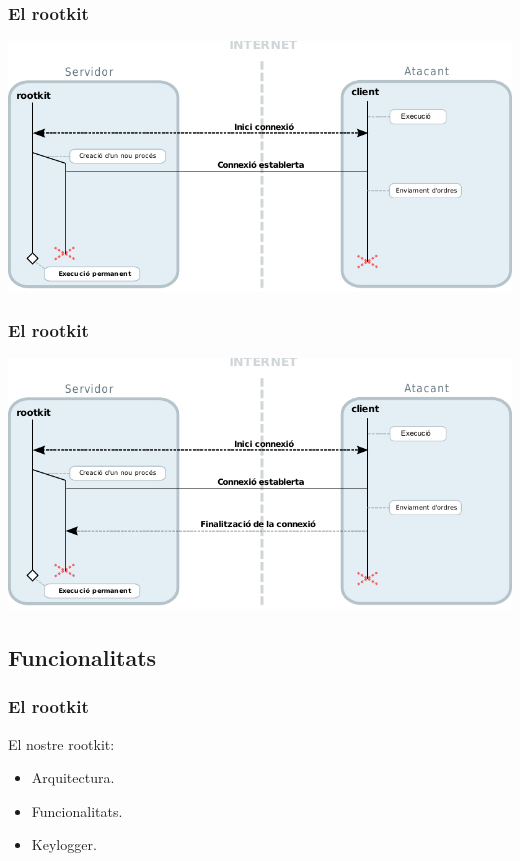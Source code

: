 \documentclass{beamer}
\begin{document}
\begin{frame}
	\frametitle{El rootkit}
	\includegraphics[scale=0.8,keepaspectratio]{arquitectura4.pdf}
\end{frame}

\begin{frame}
	\frametitle{El rootkit}
	\includegraphics[scale=0.8,keepaspectratio]{arquitectura5.pdf}
\end{frame}

\subsection{Funcionalitats}

\begin{frame}
    \frametitle{El rootkit}
	\begin{block}{El nostre rootkit:}
		\begin{itemize}
			\item Arquitectura.
			\item \alert{Funcionalitats.}
			\item Keylogger.
		\end{itemize}
	\end{block}
\end{frame}
\end{document}

